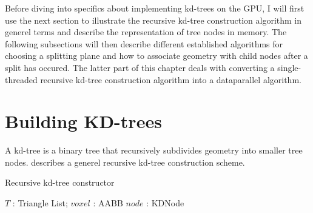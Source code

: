 Before diving into specifics about implementing kd-trees on the GPU, I will
first use the next section to illustrate the recursive kd-tree construction
algorithm in generel terms and describe the representation of tree nodes in
memory. The following subsections will then describe different established
algorithms for choosing a splitting plane and how to associate geometry with
child nodes after a split has occured. The latter part of this chapter deals
with converting a single-threaded recursive kd-tree construction algorithm into
a dataparallel algorithm.



\section{Building KD-trees}

A kd-tree is a binary tree that recursively subdivides geometry into
smaller tree nodes.  describes a generel
recursive kd-tree construction scheme.

\begin{algorithm}
  \caption{Recursive kd-tree constructor}
  \label{alg:kdTreeCreator}
  \begin{algorithmic}
              {$T$ : Triangle List; $voxel$ : AABB}
              {$node$ : KDNode}
              {
                \ELSE
                \ENDIF}
  \end{algorithmic}
\end{algorithm}



